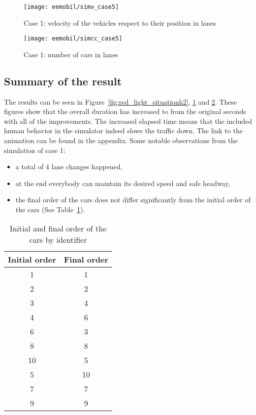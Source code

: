 			\begin{figure}
				\centering
				\texttt{[image: eemobil/simv\_case5]}
				\caption{Case 1: velocity of the vehicles respect to their position in lanes}
				\label{fig:red_light_situationv2}
			\end{figure}
			\begin{figure}
				\centering
				\texttt{[image: eemobil/simcc\_case5]}
				\caption{Case 1: number of cars in lanes}
				\label{fig:red_light_situationcc2}
			\end{figure}
			\subsection*{Summary of the result}
			The results can be seen in Figure~\ref{fig:red_light_situationh2}, \ref{fig:red_light_situationv2} and \ref{fig:red_light_situationcc2}. These figures show that the overall duration has increased to from the original seconds with all of the improvements. The increased elapsed time means that the included human behavior in the simulator indeed slows the traffic down. The link to the animation can be found in the appendix.
			Some notable observations from the simulation of case 1:
			
			\begin{itemize}
				\item a total of 4 lane changes happened,
				\item at the end everybody can maintain its desired speed and safe headway,
				\item the final order of the cars does not differ significantly from the initial order of the cars (See Table~\ref{tab:car_order_case_1}).
			\end{itemize}
			\begin{table}[ht]
				\begin{center}
					\begin{tabular}{ |c|c| }
						\hline
						Initial order & Final order \\
						\hline
						1 & 1\\
						2 & 2\\
						3 & 4\\
						4 & 6\\
						6 & 3\\
						8 & 8\\
						10 & 5\\
						5 & 10\\
						7 & 7\\
						9 & 9\\
						\hline
					\end{tabular}
				\end{center}
				\caption{Initial and final order of the cars by identifier}
				\label{tab:car_order_case_1}
			\end{table}
